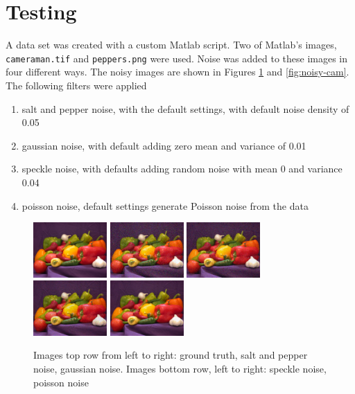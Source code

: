 \documentclass{article}
\begin{document}
\section{Testing}
\label{sec:test}
A data set was created with a custom Matlab script. Two of Matlab's images,
\texttt{cameraman.tif} and \texttt{peppers.png} were used. Noise was
added to these images in four different ways. The noisy images are
shown in Figures \ref{fig:noisy-peps} and \ref{fig:noisy-cam}. The following filters
were applied
\begin{enumerate}
  \item salt and pepper noise, with the default settings, with
  default noise density of 0.05
  \item gaussian noise, with default adding zero mean and variance
  of 0.01 
  \item speckle noise, with defaults adding random noise with mean 0
  and variance 0.04 
  \item poisson noise, default settings generate Poisson noise from
  the data
\end{enumerate}
%
\begin{figure}[t]
  \centering
  \includegraphics[width=0.25\textwidth]{images/peps_truth}
  \includegraphics[width=0.25\textwidth]{images/peps_noisy1}
  \includegraphics[width=0.25\textwidth]{images/peps_noisy2}
  \includegraphics[width=0.25\textwidth]{images/peps_noisy3}
  \includegraphics[width=0.25\textwidth]{images/peps_noisy4}
  \caption{Images top row from left to right: ground truth, salt and pepper
    noise, gaussian noise. Images bottom row, left to right: speckle noise, poisson noise}
  \label{fig:noisy-peps}
\end{figure}
\end{document}
